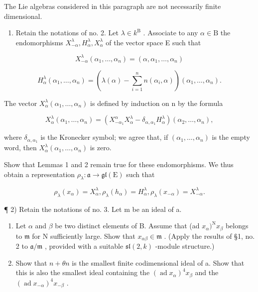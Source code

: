
The Lie algebras considered in this paragraph are not necessarily finite dimensional.

\begin{enumerate}
\def\labelenumi{\arabic{enumi})}
\tightlist
\item
  Retain the notations of no. 2. Let \(\lambda \in k^{\mathrm{B}}\) . Associate to any \(\alpha \in \mathrm{B}\) the endomorphisms \(X_{-\alpha}^{\lambda}, H_{\alpha}^{\lambda}, X_{\alpha}^{\lambda}\) of the vector space E such that
\end{enumerate}

\[
X _ {- \alpha} ^ {\lambda} (\alpha_ {1}, \ldots , \alpha_ {n}) = (\alpha , \alpha_ {1}, \ldots , \alpha_ {n})
\]

\[
H _ {\alpha} ^ {\lambda} (\alpha_ {1}, \ldots , \alpha_ {n}) = (\lambda (\alpha) - \sum_ {i = 1} ^ {n} n (\alpha_ {i}, \alpha)) (\alpha_ {1}, \ldots , \alpha_ {n}).
\]

The vector \(X_{\alpha}^{\lambda}(\alpha_{1},\ldots,\alpha_{n})\) is defined by induction on n by the formula

\[
X _ {\alpha} ^ {\lambda} (\alpha_ {1}, \ldots , \alpha_ {n}) = (X _ {- \alpha_ {1}} ^ {\alpha} X _ {\alpha} ^ {\lambda} - \delta_ {\alpha , \alpha_ {1}} H _ {\alpha} ^ {\lambda}) (\alpha_ {2}, \ldots , \alpha_ {n}),
\]

where \(\delta_{\alpha, \alpha_1}\) is the Kronecker symbol; we agree that, if \((\alpha_1, \ldots, \alpha_n)\) is the empty word, then \(X_{\alpha}^{\lambda}(\alpha_1, \ldots, \alpha_n)\) is zero.

Show that Lemmas 1 and 2 remain true for these endomorphisms. We thus obtain a representation \(\rho_{\lambda}:\mathfrak{a}\to \mathfrak{gl}(\mathrm{E})\) such that

\[
\rho_ {\lambda} (x _ {\alpha}) = X _ {\alpha} ^ {\lambda}, \rho_ {\lambda} (h _ {\alpha}) = H _ {\alpha} ^ {\lambda}, \rho_ {\lambda} (x _ {- \alpha}) = X _ {- \alpha} ^ {\lambda}.
\]

¶ 2) Retain the notations of no. 3. Let m be an ideal of a.

\begin{enumerate}
\def\labelenumi{\alph{enumi})}
\item
  Let \(\alpha\) and \(\beta\) be two distinct elements of B. Assume that (ad \(x_{\alpha})^{\mathrm{N}}x_{\beta}\) belongs to \(\mathfrak{m}\) for N sufficiently large. Show that \(x_{\alpha \beta} \in \mathfrak{m}\) . (Apply the results of §1, no. 2 to \(\mathfrak{a} / \mathfrak{m}\) , provided with a suitable \(\mathfrak{sl}(2,k)\) -module structure.)
\item
  Show that \(n + \theta n\) is the smallest finite codimensional ideal of a. Show that this is also the smallest ideal containing the \((\operatorname{ad} x_{\alpha})^{4}x_{\beta}\) and the \((\operatorname{ad} x_{-\alpha})^{4}x_{-\beta}\) .
\end{enumerate}

